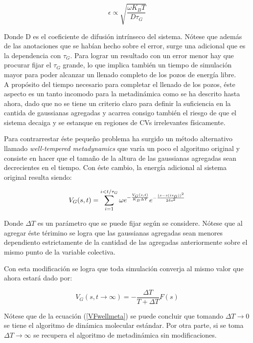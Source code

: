\documentclass [11pt]{article}
\begin{document}
\begin{equation}
    \epsilon \propto\sqrt{\frac{\omega K_BT}{D\tau_G}}
\end{equation}

Donde D es el coeficiente de difusión intrínseco del sistema. Nótese que además de las anotaciones que se habían hecho sobre el error, surge una adicional que es la dependencia con $\tau_G$. Para lograr un resultado con un error menor hay que procurar fijar el $\tau_G$ grande, lo que implica también un tiempo de simulación mayor para poder alcanzar un llenado completo de los pozos de energía libre.\\

A propósito del tiempo necesario para completar el llenado de los pozos, éste aspecto es un tanto incomodo para la metadinámica como se ha descrito hasta ahora, dado que no se tiene un criterio claro para definir la suficiencia en la cantida de gaussianas agregadas y acarrea consigo también el riesgo de que el sistema decaiga y se estanque en regiones de CVs irrelevantes físicamente.

Para contrarrestar éste pequeño problema ha surgido un método alternativo llamado {\it well-tempered metadynamics} \cite{wellmeta} que varía un poco el algoritmo original y consiste en hacer que el tamaño de la altura de las gaussianas agregadas sean decrecientes en el tiempo. Con éste cambio, la energía adicional al sistema original resulta siendo:

\begin{equation}
     V_G(s,t)=\sum_{i=1}^{i<t/\tau_G}\omega e^{-\frac{V_G(s,t)}{K_B\Delta T}}e^{-\frac{(s-s(i \tau_{\small{G}}))^2}{2\delta s^2}}
\end{equation}

 Donde $\Delta T$ es un parámetro que se puede fijar según se considere. Nótese que al agregar éste térimino se logra que las gaussianas agregadas sean menores dependiento estrictamente de la cantidad de las agregadas anteriormente sobre el mismo punto de la variable colectiva. 
 
 Con esta modificación se logra que toda simulación converja al mismo valor que ahora estará dado por:
 
 \begin{equation}\label{VFwellmeta}
     V_G(s,t\rightarrow\infty)=-\frac{\Delta T}{T+\Delta T} F(s)
 \end{equation}

Nótese que de la ecuación (\ref{VFwellmeta}) se puede concluir que tomando $\Delta T\rightarrow0$ se tiene el algoritmo de dinámica molecular estándar. Por otra parte, si se toma $\Delta T\rightarrow\infty$ se recupera el algoritmo de metadinámica sin modificaciones.
\end{document}
